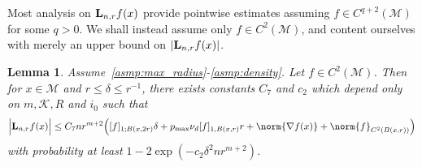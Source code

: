 \documentclass{article}
\newcommand{\1}{\mathbf{1}}
\newcommand{\Lap}{{\bf L}}
\newcommand{\mc}[1]{\mathcal{#1}}
\theoremstyle{alden}
\theoremstyle{aldenthm}
\newtheorem{lemma}{Lemma}
\theoremstyle{definition}
\theoremstyle{remark}
\begin{document}
Most analysis on $\Lap_{n,r}f(x)$ provide pointwise estimates assuming $f \in C^{q + 2}(\mc{M})$ for some $q > 0$. We shall instead assume only $f \in C^2(\mc{M})$, and content ourselves with merely an upper bound on $|\Lap_{n,r}f(x)|$.
\begin{lemma}
	\label{lem:pointwise_laplacian_ub}
	Assume~\ref{asmp:max_radius}-\ref{asmp:density}. Let $f \in C^2(\mc{M})$. Then for $x \in \mc{M}$ and $r \leq \delta \leq r^{-1}$, there exists constants $C_7$ and $c_2$ which depend only on $m,\mc{K},R$ and $i_0$ such that
	\begin{equation*}
	\Bigl|\Lap_{n,r}f(x)\Bigr| \leq C_7 nr^{m + 2}\Bigl([f]_{1;B(x,2r)}\delta + p_{\max} \nu_d[f]_{1,B(x,r)} r + \norm{\nabla f(x)} +  \norm{f}_{C^2(B(x,r))}\Bigr)
	\end{equation*}
	with probability at least $1 - 2\exp(-c_2\delta^2 n r^{m + 2})$.
\end{lemma}
\end{document}
